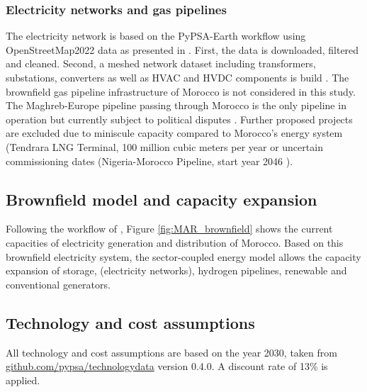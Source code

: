 \subsubsection*{Electricity networks and gas pipelines}
The electricity network is based on the PyPSA-Earth workflow using OpenStreetMap2022 data \cite{OpenStreetMap2022} as presented in \cite{Parzen2023}. First, the data is downloaded, filtered and cleaned. Second, a meshed network dataset including transformers, substations, converters as well as HVAC and HVDC components is build \cite{Parzen2023}. 
The brownfield gas pipeline infrastructure of Morocco is not considered in this study. The Maghreb-Europe pipeline passing through Morocco is the only pipeline in operation but currently subject to political disputes \cite{Rachidi2022}. Further proposed projects are excluded due to  miniscule capacity compared to Morocco's energy system (Tendrara LNG Terminal, 100 million cubic meters per year %
 or uncertain commissioning dates (Nigeria-Morocco Pipeline, start year 2046 \cite{GEM2023b}).


\subsection*{Brownfield model and capacity expansion}
\label{brownfield_model}
Following the workflow of \cite{Parzen2023}, Figure \ref{fig:MAR_brownfield} shows the current capacities of electricity generation and distribution of Morocco. Based on this brownfield electricity system, the sector-coupled energy model allows the capacity expansion of storage, (electricity networks), hydrogen pipelines, renewable and conventional generators.

\subsection*{Technology and cost assumptions}
\label{subsec:tech_assump}
All technology and cost assumptions are based on the year 2030, taken from \href{https://github.com/pypsa/technologydata}{github.com/pypsa/technologydata} version 0.4.0. A discount rate of 13\% is applied.


